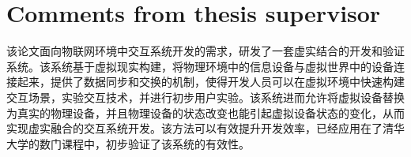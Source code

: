 
\chapter{Comments from thesis supervisor}

该论文面向物联网环境中交互系统开发的需求，研发了一套虚实结合的开发和验证系统。该系统基于虚拟现实构建，将物理环境中的信息设备与虚拟世界中的设备连接起来，提供了数据同步和交换的机制，使得开发人员可以在虚拟环境中快速构建交互场景，实验交互技术，并进行初步用户实验。该系统进而允许将虚拟设备替换为真实的物理设备，并且物理设备的状态改变也能引起虚拟设备状态的变化，从而实现虚实融合的交互系统开发。该方法可以有效提升开发效率，已经应用在了清华大学的数门课程中，初步验证了该系统的有效性。